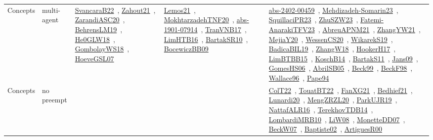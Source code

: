 {\begin{longtable}{lp{3cm}>{\raggedright\arraybackslash}p{6cm}>{\raggedright\arraybackslash}p{6cm}>{\raggedright\arraybackslash}p{8cm}}
Concepts & multi-agent & \href{works/SvancaraB22.pdf}{SvancaraB22}~\cite{SvancaraB22}, \href{works/Zahout21.pdf}{Zahout21}~\cite{Zahout21}, \href{works/ZarandiASC20.pdf}{ZarandiASC20}~\cite{ZarandiASC20}, \href{works/BehrensLM19.pdf}{BehrensLM19}~\cite{BehrensLM19}, \href{works/He0GLW18.pdf}{He0GLW18}~\cite{He0GLW18}, \href{works/GombolayWS18.pdf}{GombolayWS18}~\cite{GombolayWS18}, \href{works/HoeveGSL07.pdf}{HoeveGSL07}~\cite{HoeveGSL07} & \href{works/Lemos21.pdf}{Lemos21}~\cite{Lemos21}, \href{works/MokhtarzadehTNF20.pdf}{MokhtarzadehTNF20}~\cite{MokhtarzadehTNF20}, \href{works/abs-1901-07914.pdf}{abs-1901-07914}~\cite{abs-1901-07914}, \href{works/TranVNB17.pdf}{TranVNB17}~\cite{TranVNB17}, \href{works/LimHTB16.pdf}{LimHTB16}~\cite{LimHTB16}, \href{works/BartakSR10.pdf}{BartakSR10}~\cite{BartakSR10}, \href{works/BocewiczBB09.pdf}{BocewiczBB09}~\cite{BocewiczBB09} & \href{works/abs-2402-00459.pdf}{abs-2402-00459}~\cite{abs-2402-00459}, \href{works/Mehdizadeh-Somarin23.pdf}{Mehdizadeh-Somarin23}~\cite{Mehdizadeh-Somarin23}, \href{works/SquillaciPR23.pdf}{SquillaciPR23}~\cite{SquillaciPR23}, \href{works/ZhuSZW23.pdf}{ZhuSZW23}~\cite{ZhuSZW23}, \href{works/Fatemi-AnarakiTFV23.pdf}{Fatemi-AnarakiTFV23}~\cite{Fatemi-AnarakiTFV23}, \href{works/AbreuAPNM21.pdf}{AbreuAPNM21}~\cite{AbreuAPNM21}, \href{works/ZhangYW21.pdf}{ZhangYW21}~\cite{ZhangYW21}, \href{works/MejiaY20.pdf}{MejiaY20}~\cite{MejiaY20}, \href{works/WessenCS20.pdf}{WessenCS20}~\cite{WessenCS20}, \href{works/WikarekS19.pdf}{WikarekS19}~\cite{WikarekS19}, \href{works/BadicaBIL19.pdf}{BadicaBIL19}~\cite{BadicaBIL19}, \href{works/ZhangW18.pdf}{ZhangW18}~\cite{ZhangW18}, \href{works/HookerH17.pdf}{HookerH17}~\cite{HookerH17}, \href{works/LimBTBB15.pdf}{LimBTBB15}~\cite{LimBTBB15}, \href{works/KoschB14.pdf}{KoschB14}~\cite{KoschB14}, \href{works/BartakS11.pdf}{BartakS11}~\cite{BartakS11}, \href{works/Jans09.pdf}{Jans09}~\cite{Jans09}, \href{works/GomesHS06.pdf}{GomesHS06}~\cite{GomesHS06}, \href{works/AbrilSB05.pdf}{AbrilSB05}~\cite{AbrilSB05}, \href{works/Beck99.pdf}{Beck99}~\cite{Beck99}, \href{works/BeckF98.pdf}{BeckF98}~\cite{BeckF98}, \href{works/Wallace96.pdf}{Wallace96}~\cite{Wallace96}, \href{works/Pape94.pdf}{Pape94}~\cite{Pape94}\\
Concepts & no preempt &  &  & \href{works/ColT22.pdf}{ColT22}~\cite{ColT22}, \href{works/TouatBT22.pdf}{TouatBT22}~\cite{TouatBT22}, \href{works/FanXG21.pdf}{FanXG21}~\cite{FanXG21}, \href{works/Bedhief21.pdf}{Bedhief21}~\cite{Bedhief21}, \href{works/Lunardi20.pdf}{Lunardi20}~\cite{Lunardi20}, \href{works/MengZRZL20.pdf}{MengZRZL20}~\cite{MengZRZL20}, \href{works/ParkUJR19.pdf}{ParkUJR19}~\cite{ParkUJR19}, \href{works/NattafALR16.pdf}{NattafALR16}~\cite{NattafALR16}, \href{works/TerekhovTDB14.pdf}{TerekhovTDB14}~\cite{TerekhovTDB14}, \href{works/LombardiMRB10.pdf}{LombardiMRB10}~\cite{LombardiMRB10}, \href{works/LiW08.pdf}{LiW08}~\cite{LiW08}, \href{works/MonetteDD07.pdf}{MonetteDD07}~\cite{MonetteDD07}, \href{works/BeckW07.pdf}{BeckW07}~\cite{BeckW07}, \href{works/Baptiste02.pdf}{Baptiste02}~\cite{Baptiste02}, \href{works/ArtiguesR00.pdf}{ArtiguesR00}~\cite{ArtiguesR00}\\

\end{longtable}}
